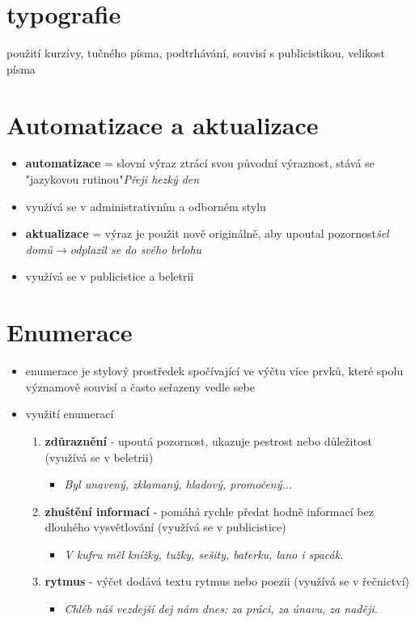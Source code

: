 \documentclass{memoir}
\begin{document}
\section*{typografie}
použití kurzívy, tučného písma, podtrhávání, souvisí s publicistikou, velikost písma

\section*{Automatizace a aktualizace}
	\begin{itemize}
		\item \textbf{automatizace} = slovní výraz ztrácí svou původní výraznost, stává se "jazykovou rutinou"\hfill\textit{Přeji hezký den}
		\item využívá se v administrativním a odborném stylu
		\item \textbf{aktualizace} = výraz je použit nově originálně, aby upoutal pozornost\hfill\textit{šel domů$\rightarrow$odplazil se do svého brlohu} 
		\item využívá se v publicistice a beletrii
	\end{itemize}

\section*{Enumerace}
	\begin{itemize}
		\item enumerace je stylový prostředek spočívající ve výčtu více prvků, které spolu významově souvisí a často seřazeny vedle sebe
		\item využití enumerací
		\begin{enumerate}
			\item \textbf{zdůraznění} - upoutá pozornost, ukazuje pestrost nebo důležitost (využívá se v beletrii)
			\begin{itemize}
				\item \textit{Byl unavený, zklamaný, hladový, promočený...}
			\end{itemize}
			\item \textbf{zhuštění informací} - pomáhá rychle předat hodně informací bez dlouhého vysvětlování (využívá se v publicistice)
			\begin{itemize}
				\item \textit{V kufru měl knížky, tužky, sešity, baterku, lano i spacák.}
			\end{itemize}
			\item \textbf{rytmus} - výčet dodává textu rytmus nebo poezii (využívá se v řečnictví)
			\begin{itemize}
				\item \textit{Chléb náš vezdejší dej nám dnes: za práci, za únavu, za naději.}
			\end{itemize}
		\end{enumerate}
	\end{itemize}
\end{document}
